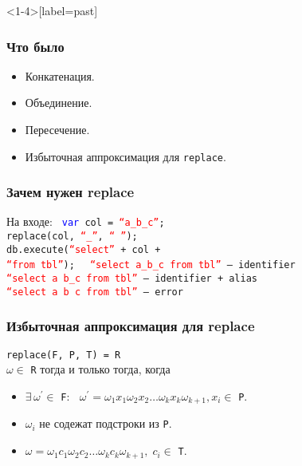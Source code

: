 \documentclass[18pt,pdf,hyperref={unicode}]{beamer}
\newcommand{\listing}[1]{\texttt{\colorbox{mlisting}{#1}}}
\newcommand{\smalltt}[1]{\texttt{\small {#1}}}
\newcommand{\blue}[1]{\textcolor{blue}{#1}}
\newcommand{\red}[1]{\textcolor{red}{#1}}
\begin{document}
\begin{frame}<1-4>[label=past]
\frametitle{Что было}
\begin{itemize}
  \item<1-> Конкатенация.
  \smallskip
  \item<2-> Объединение.
  \smallskip
  \item<3-> Пересечение.
  \smallskip
  \item<4-> Избыточная аппроксимация для \listing{replace}.
\end{itemize}
\end{frame}


\begin{frame}
\frametitle{Зачем нужен replace}

На входе:
\smalltt{
  \hskip60pt \blue{var} col = \red{``a\_b\_c''}; \\
  \hskip60pt\hskip49pt replace(col, \red{``\_''}, \red{`` ''}); \\
  \hskip60pt\hskip49pt db.execute(\red{``select''} + col + \\
      \hskip60pt\hskip175pt \red{``from tbl''});
}
\vskip40pt
\smalltt{
  \red{``select a\_b\_c from tbl''} -- identifier \\\vskip25pt
  \red{``select a b\_c from tbl''} -- identifier + alias \\\vskip25pt
  \red{``select a b c from tbl''} -- error
}
\end{frame}


\begin{frame}
\frametitle{Избыточная аппроксимация для replace}
\begin{block}{\vskip-1pt\texttt{replace(F, P, T) = R}\\\vskip3pt}
  \smallskip
  $\omega \in$ \texttt{R} тогда и только тогда, когда
  \smallskip
  \begin{itemize}
    \item $\exists\, \omega^\prime \in$ \texttt{F}:
        $\;\;\omega^\prime = \omega_1x_1\omega_2x_2\dots\omega_kx_k\omega_{k+1}, x_i \in$ \texttt{P}.
    \item $\omega_i$ не содежат подстроки из \texttt{P}.
    \item $\omega = \omega_1c_1\omega_2c_2\dots\omega_kc_k\omega_{k+1},\; c_i \in$ \texttt{T}.
  \end{itemize}
  \smallskip
\end{block}
\end{frame}
\end{document}
